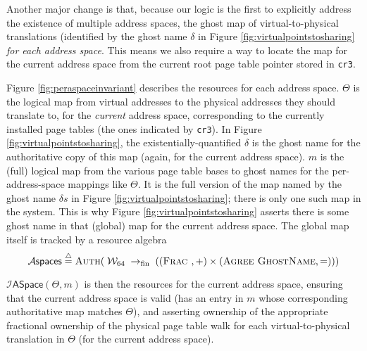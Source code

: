 Another major change is that, because our logic is the first to explicitly address the existence of multiple address spaces,
the ghost map of virtual-to-physical translations (identified by the ghost name $\delta$ in Figure \ref{fig:virtualpointstosharing}
 \emph{for each address space}. This means we also require a way to locate the map for the current address space
from the current root page table pointer stored in \lstinline|cr3|.

Figure \ref{fig:peraspaceinvariant} describes the resources for each address space.
$\Theta$ is the logical map from virtual addresses to the physical addresses they should translate to, 
for the \emph{current} address space, corresponding to the currently installed page tables (the ones
indicated by \lstinline|cr3|). In Figure \ref{fig:virtualpointstosharing}, the existentially-quantified $\delta$
is the ghost name for the authoritative copy of this map (again, for the current address space).
$m$ is the (full) logical map from the various page table bases to ghost names for the 
per-address-space mappings like $\Theta$.
It is the full version of the map named by the ghost name $\delta{}s$ in
Figure \ref{fig:virtualpointstosharing}; there is only one such map in the system.
This is why Figure \ref{fig:virtualpointstosharing} asserts there is some ghost name in that (global) map
for the current address space.
The global map itself is tracked by a resource algebra 
\[\mathcal{A}\textsf{spaces} \stackrel{\triangle}{=} \textsc{Auth} (\; \mathcal{W}_{64} \;\rightarrow_{\textrm{fin}} \;  ( (\textsc{Frac }, \mathord{+}) \times (\textsc{Agree } \textsc{GhostName},\mathord{=}) )) \]


$\mathcal{I}\textsf{ASpace}(\Theta,m)$ is then the resources for the current address space,
ensuring that the current address space is valid (has an entry in $m$ whose corresponding
authoritative map matches $\Theta$), and asserting ownership of the appropriate fractional ownership
of the physical page table walk for each virtual-to-physical translation in $\Theta$ (for the current address space).



